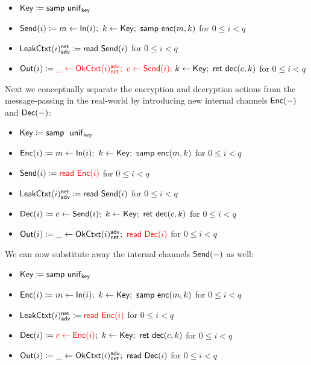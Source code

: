 \begin{itemize}
\item $\mathsf{Key} \coloneqq \mathsf{samp} \ \mathsf{unif}_{\mathsf{key}}$
\item $\mathsf{Send}(i) \coloneqq m \leftarrow \mathsf{In}(i); \ k \leftarrow \mathsf{Key}; \ \mathsf{samp} \ \mathsf{enc}(m,k)$ for $0 \leq i < q$
\item $\mathsf{LeakCtxt}(i)^{\mathsf{net}}_{\mathsf{adv}} \coloneqq \mathsf{read} \ \mathsf{Send}(i)$ for $0 \leq i < q$
\item $\mathsf{Out}(i) \coloneqq {\color{red} \_ \leftarrow \mathsf{OkCtxt}(i)^{\mathsf{adv}}_{\mathsf{net}}; \ c \leftarrow \mathsf{Send}(i);} \ k \leftarrow \mathsf{Key}; \ \mathsf{ret} \ \mathsf{dec}(c,k)$ for $0 \leq i < q$
\end{itemize}

\noindent Next we conceptually separate the encryption and decryption actions from the message-passing in the real-world by introducing new internal channels $\mathsf{Enc}(-)$ and $\mathsf{Dec}(-)$:

\begin{itemize}
\item $\Key \coloneqq \samp \ \unif_\key$
\item {\color{red} $\mathsf{Enc}(i) \coloneqq m \leftarrow \mathsf{In}(i); \ k \leftarrow \mathsf{Key}; \ \mathsf{samp} \ \mathsf{enc}(m,k)$ for $0 \leq i < q$}
\item $\mathsf{Send}(i) \coloneqq {\color{red} \mathsf{read} \ \mathsf{Enc}(i)}$ for $0 \leq i < q$
\item $\mathsf{LeakCtxt}(i)^{\mathsf{net}}_{\mathsf{adv}} \coloneqq \mathsf{read} \ \mathsf{Send}(i)$ for $0 \leq i < q$
\item {\color{red} $\mathsf{Dec}(i) \coloneqq c \leftarrow \mathsf{Send}(i); \ k \leftarrow \mathsf{Key}; \ \mathsf{ret} \ \mathsf{dec}(c,k)$ for $0 \leq i < q$}
\item $\mathsf{Out}(i) \coloneqq \_ \leftarrow \mathsf{OkCtxt}(i)^{\mathsf{adv}}_{\mathsf{net}}; \ {\color{red} \mathsf{read} \ \mathsf{Dec}(i)}$ for $0 \leq i < q$
\end{itemize}

\noindent We can now substitute away the internal channels $\mathsf{Send}(-)$ as well:

\begin{itemize}
\item $\mathsf{Key} \coloneqq \mathsf{samp} \ \mathsf{unif}_{\mathsf{key}}$
\item $\mathsf{Enc}(i) \coloneqq m \leftarrow \mathsf{In}(i); \ k \leftarrow \mathsf{Key}; \ \mathsf{samp} \ \mathsf{enc}(m,k)$ for $0 \leq i < q$
\item $\mathsf{LeakCtxt}(i)^{\mathsf{net}}_{\mathsf{adv}} \coloneqq {\color{red} \mathsf{read} \ \mathsf{Enc}(i)}$ for $0 \leq i < q$
\item $\mathsf{Dec}(i) \coloneqq {\color{red} c \leftarrow \mathsf{Enc}(i)}; \ k \leftarrow \mathsf{Key}; \ \mathsf{ret} \ \mathsf{dec}(c,k)$ for $0 \leq i < q$
\item $\mathsf{Out}(i) \coloneqq \_ \leftarrow \mathsf{OkCtxt}(i)^{\mathsf{adv}}_{\mathsf{net}}; \ \mathsf{read} \ \mathsf{Dec}(i)$ for $0 \leq i < q$
\end{itemize}

